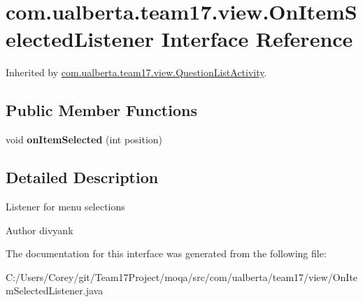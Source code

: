 \hypertarget{interfacecom_1_1ualberta_1_1team17_1_1view_1_1_on_item_selected_listener}{\section{com.\+ualberta.\+team17.\+view.\+On\+Item\+Selected\+Listener Interface Reference}
\label{interfacecom_1_1ualberta_1_1team17_1_1view_1_1_on_item_selected_listener}
}


Inherited by \hyperlink{classcom_1_1ualberta_1_1team17_1_1view_1_1_question_list_activity}{com.\+ualberta.\+team17.\+view.\+Question\+List\+Activity}.

\subsection*{Public Member Functions}
\begin{DoxyCompactItemize}
\item 
\hypertarget{interfacecom_1_1ualberta_1_1team17_1_1view_1_1_on_item_selected_listener_a3d5a8a0394aaf000450b33dfdcfc159e}{void {\bfseries on\+Item\+Selected} (int position)}\label{interfacecom_1_1ualberta_1_1team17_1_1view_1_1_on_item_selected_listener_a3d5a8a0394aaf000450b33dfdcfc159e}

\end{DoxyCompactItemize}


\subsection{Detailed Description}
Listener for menu selections

\begin{DoxyAuthor}{Author}
divyank 
\end{DoxyAuthor}


The documentation for this interface was generated from the following file\+:\begin{DoxyCompactItemize}
\item 
C\+:/\+Users/\+Corey/git/\+Team17\+Project/moqa/src/com/ualberta/team17/view/On\+Item\+Selected\+Listener.\+java\end{DoxyCompactItemize}
